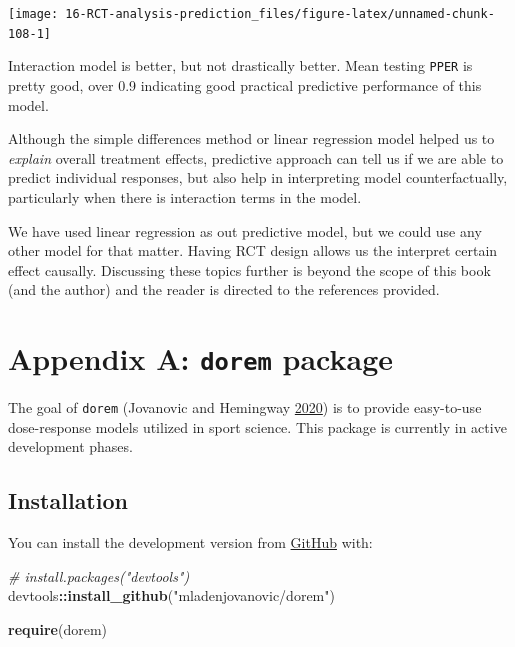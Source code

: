 \documentclass[
]{book}
\newenvironment{Shaded}{\begin{snugshade}}{\end{snugshade}}
\newcommand{\CommentTok}[1]{\textcolor[rgb]{0.56,0.35,0.01}{\textit{#1}}}
\newcommand{\KeywordTok}[1]{\textcolor[rgb]{0.13,0.29,0.53}{\textbf{#1}}}
\newcommand{\NormalTok}[1]{#1}
\newcommand{\OperatorTok}[1]{\textcolor[rgb]{0.81,0.36,0.00}{\textbf{#1}}}
\newcommand{\StringTok}[1]{\textcolor[rgb]{0.31,0.60,0.02}{#1}}
\begin{document}
\begin{center}\texttt{[image: 16-RCT-analysis-prediction\_files/figure-latex/unnamed-chunk-108-1]} \end{center}

Interaction model is better, but not drastically better. Mean testing \texttt{PPER} is pretty good, over 0.9 indicating good practical predictive performance of this model.

Although the simple differences method or linear regression model helped us to \emph{explain} overall treatment effects, predictive approach can tell us if we are able to predict individual responses, but also help in interpreting model counterfactually, particularly when there is interaction terms in the model.

We have used linear regression as out predictive model, but we could use any other model for that matter. Having RCT design allows us the interpret certain effect causally. Discussing these topics further is beyond the scope of this book (and the author) and the reader is directed to the references provided.

\hypertarget{appendix-a-dorem-package}{%
\chapter{\texorpdfstring{Appendix A: \texttt{dorem} package}{Appendix A: dorem package}}\label{appendix-a-dorem-package}}

The goal of \texttt{dorem} (Jovanovic and Hemingway \protect\hyperlink{ref-R-dorem}{2020}) is to provide easy-to-use dose-response models utilized in sport science. This package is currently in active development phases.

\hypertarget{installation}{%
\section{Installation}\label{installation}}

You can install the development version from \href{https://github.com/mladenjovanovic/dorem}{GitHub} with:

\begin{Shaded}
\begin{Highlighting}[]
\CommentTok{\# install.packages("devtools")}
\NormalTok{devtools}\OperatorTok{::}\KeywordTok{install\_github}\NormalTok{(}\StringTok{"mladenjovanovic/dorem"}\NormalTok{)}

\KeywordTok{require}\NormalTok{(dorem)}
\end{Highlighting}
\end{Shaded}
\end{document}
